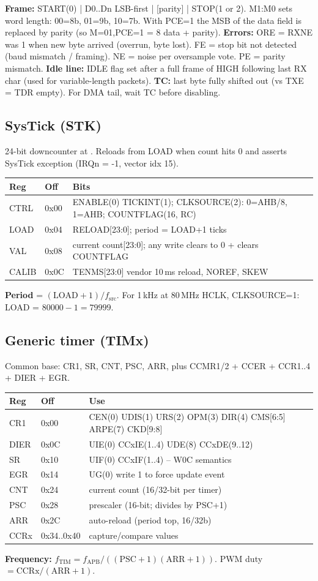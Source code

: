 \textbf{Frame:} START(0) | D0..Dn LSB-first | [parity] | STOP(1 or 2). M1:M0 sets word length: 00=8b, 01=9b, 10=7b. With PCE=1 the MSB of the data field is replaced by parity (so M=01,PCE=1 = 8 data + parity).
\textbf{Errors:} ORE = RXNE was 1 when new byte arrived (overrun, byte lost). FE = stop bit not detected (baud mismatch / framing). NE = noise per oversample vote. PE = parity mismatch.
\textbf{Idle line:} IDLE flag set after a full frame of HIGH following last RX char (used for variable-length packets). \textbf{TC:} last byte fully shifted out (vs TXE = TDR empty). For DMA tail, wait TC before disabling.

\subsection{SysTick (STK)}
24-bit downcounter at . Reloads from LOAD when count hits 0 and asserts SysTick exception (IRQn = -1, vector idx 15).
\begin{tabular}{@{}llp{}@{}}
\toprule
\textbf{Reg} & \textbf{Off} & \textbf{Bits}\\
\midrule
CTRL  & 0x00 & ENABLE(0) TICKINT(1); CLKSOURCE(2): 0=AHB/8, 1=AHB; COUNTFLAG(16, RC)\\
LOAD  & 0x04 & RELOAD[23:0]; period = LOAD+1 ticks\\
VAL   & 0x08 & current count[23:0]; any write clears to 0 + clears COUNTFLAG\\
CALIB & 0x0C & TENMS[23:0] vendor 10\,ms reload, NOREF, SKEW\\
\bottomrule
\end{tabular}
\textbf{Period} = $(\text{LOAD}+1)/f_{\text{src}}$. For 1\,kHz at 80\,MHz HCLK, CLKSOURCE=1: LOAD = $80000-1 = 79999$.

\subsection{Generic timer (TIMx)}
Common base: CR1, SR, CNT, PSC, ARR, plus CCMR1/2 + CCER + CCR1..4 + DIER + EGR.
\begin{tabular}{@{}llp{}@{}}
\toprule
\textbf{Reg} & \textbf{Off} & \textbf{Use}\\
\midrule
CR1   & 0x00 & CEN(0) UDIS(1) URS(2) OPM(3) DIR(4) CMS[6:5] ARPE(7) CKD[9:8]\\
DIER  & 0x0C & UIE(0) CCxIE(1..4) UDE(8) CCxDE(9..12)\\
SR    & 0x10 & UIF(0) CCxIF(1..4) -- W0C semantics\\
EGR   & 0x14 & UG(0) write 1 to force update event\\
CNT   & 0x24 & current count (16/32-bit per timer)\\
PSC   & 0x28 & prescaler (16-bit; divides by PSC+1)\\
ARR   & 0x2C & auto-reload (period top, 16/32b)\\
CCRx  & 0x34..0x40 & capture/compare values\\
\bottomrule
\end{tabular}
\textbf{Frequency:} $f_{\text{TIM}} = f_{\text{APB}}/((\text{PSC}{+}1)(\text{ARR}{+}1))$. PWM duty $= \text{CCRx}/(\text{ARR}+1)$.

